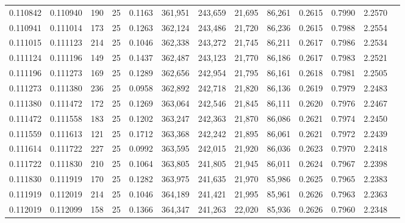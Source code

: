 \begin{tabular}{rrrrrrrrrrrrr}
0.110842 & 0.110940 &   190 &  25 &                                     0.1163 & 361,951 & 243,659 &  21,695 &  86,261 & 0.2615 & 0.7990 & 2.2570 \\
0.110941 & 0.111014 &   173 &  25 &                                     0.1263 & 362,124 & 243,486 &  21,720 &  86,236 & 0.2615 & 0.7988 & 2.2554 \\
0.111015 & 0.111123 &   214 &  25 &                                     0.1046 & 362,338 & 243,272 &  21,745 &  86,211 & 0.2617 & 0.7986 & 2.2534 \\
0.111124 & 0.111196 &   149 &  25 &                                     0.1437 & 362,487 & 243,123 &  21,770 &  86,186 & 0.2617 & 0.7983 & 2.2521 \\
0.111196 & 0.111273 &   169 &  25 &                                     0.1289 & 362,656 & 242,954 &  21,795 &  86,161 & 0.2618 & 0.7981 & 2.2505 \\
0.111273 & 0.111380 &   236 &  25 &                                     0.0958 & 362,892 & 242,718 &  21,820 &  86,136 & 0.2619 & 0.7979 & 2.2483 \\
0.111380 & 0.111472 &   172 &  25 &                                     0.1269 & 363,064 & 242,546 &  21,845 &  86,111 & 0.2620 & 0.7976 & 2.2467 \\
0.111472 & 0.111558 &   183 &  25 &                                     0.1202 & 363,247 & 242,363 &  21,870 &  86,086 & 0.2621 & 0.7974 & 2.2450 \\
0.111559 & 0.111613 &   121 &  25 &                                     0.1712 & 363,368 & 242,242 &  21,895 &  86,061 & 0.2621 & 0.7972 & 2.2439 \\
0.111614 & 0.111722 &   227 &  25 &                                     0.0992 & 363,595 & 242,015 &  21,920 &  86,036 & 0.2623 & 0.7970 & 2.2418 \\
0.111722 & 0.111830 &   210 &  25 &                                     0.1064 & 363,805 & 241,805 &  21,945 &  86,011 & 0.2624 & 0.7967 & 2.2398 \\
0.111830 & 0.111919 &   170 &  25 &                                     0.1282 & 363,975 & 241,635 &  21,970 &  85,986 & 0.2625 & 0.7965 & 2.2383 \\
0.111919 & 0.112019 &   214 &  25 &                                     0.1046 & 364,189 & 241,421 &  21,995 &  85,961 & 0.2626 & 0.7963 & 2.2363 \\
0.112019 & 0.112099 &   158 &  25 &                                     0.1366 & 364,347 & 241,263 &  22,020 &  85,936 & 0.2626 & 0.7960 & 2.2348 \\

\end{tabular}
